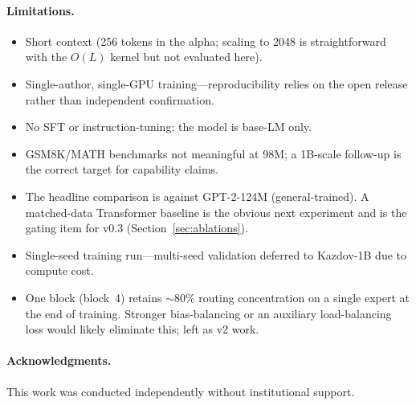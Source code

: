 \documentclass[11pt]{article}
\begin{document}
\paragraph{Limitations.}
\begin{itemize}
\item Short context (256 tokens in the alpha; scaling to 2048 is
    straightforward with the $O(L)$ kernel but not evaluated here).
\item Single-author, single-GPU training---reproducibility relies on the
    open release rather than independent confirmation.
\item No SFT or instruction-tuning; the model is base-LM only.
\item GSM8K/MATH benchmarks not meaningful at 98M; a 1B-scale follow-up
    is the correct target for capability claims.
\item The headline comparison is against GPT-2-124M (general-trained).
    A matched-data Transformer baseline is the obvious next experiment
    and is the gating item for v0.3 (Section~\ref{sec:ablations}).
\item Single-seed training run---multi-seed validation deferred to
    Kazdov-1B due to compute cost.
\item One block (block~4) retains $\sim\!80\%$ routing concentration
    on a single expert at the end of training.  Stronger
    bias-balancing or an auxiliary load-balancing loss would likely
    eliminate this; left as v2 work.
\end{itemize}

\paragraph{Acknowledgments.}
This work was conducted independently without institutional support.



\end{document}
